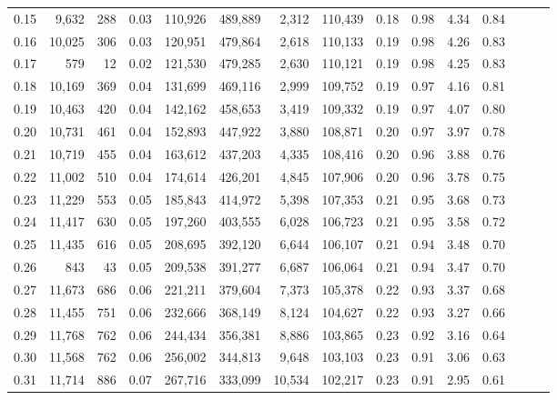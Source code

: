 \begin{tabular}{rrrrrrrrrrrrrrr}
0.15 &   9,632 &    288 &  0.03 &  110,926 &  489,889 &    2,312 &  110,439 &  0.18 &  0.98 &  4.34 &      0.84 \\
0.16 &  10,025 &    306 &  0.03 &  120,951 &  479,864 &    2,618 &  110,133 &  0.19 &  0.98 &  4.26 &      0.83 \\
0.17 &     579 &     12 &  0.02 &  121,530 &  479,285 &    2,630 &  110,121 &  0.19 &  0.98 &  4.25 &      0.83 \\
0.18 &  10,169 &    369 &  0.04 &  131,699 &  469,116 &    2,999 &  109,752 &  0.19 &  0.97 &  4.16 &      0.81 \\
0.19 &  10,463 &    420 &  0.04 &  142,162 &  458,653 &    3,419 &  109,332 &  0.19 &  0.97 &  4.07 &      0.80 \\
0.20 &  10,731 &    461 &  0.04 &  152,893 &  447,922 &    3,880 &  108,871 &  0.20 &  0.97 &  3.97 &      0.78 \\
0.21 &  10,719 &    455 &  0.04 &  163,612 &  437,203 &    4,335 &  108,416 &  0.20 &  0.96 &  3.88 &      0.76 \\
0.22 &  11,002 &    510 &  0.04 &  174,614 &  426,201 &    4,845 &  107,906 &  0.20 &  0.96 &  3.78 &      0.75 \\
0.23 &  11,229 &    553 &  0.05 &  185,843 &  414,972 &    5,398 &  107,353 &  0.21 &  0.95 &  3.68 &      0.73 \\
0.24 &  11,417 &    630 &  0.05 &  197,260 &  403,555 &    6,028 &  106,723 &  0.21 &  0.95 &  3.58 &      0.72 \\
0.25 &  11,435 &    616 &  0.05 &  208,695 &  392,120 &    6,644 &  106,107 &  0.21 &  0.94 &  3.48 &      0.70 \\
0.26 &     843 &     43 &  0.05 &  209,538 &  391,277 &    6,687 &  106,064 &  0.21 &  0.94 &  3.47 &      0.70 \\
0.27 &  11,673 &    686 &  0.06 &  221,211 &  379,604 &    7,373 &  105,378 &  0.22 &  0.93 &  3.37 &      0.68 \\
0.28 &  11,455 &    751 &  0.06 &  232,666 &  368,149 &    8,124 &  104,627 &  0.22 &  0.93 &  3.27 &      0.66 \\
0.29 &  11,768 &    762 &  0.06 &  244,434 &  356,381 &    8,886 &  103,865 &  0.23 &  0.92 &  3.16 &      0.64 \\
0.30 &  11,568 &    762 &  0.06 &  256,002 &  344,813 &    9,648 &  103,103 &  0.23 &  0.91 &  3.06 &      0.63 \\
0.31 &  11,714 &    886 &  0.07 &  267,716 &  333,099 &   10,534 &  102,217 &  0.23 &  0.91 &  2.95 &      0.61 \\

\end{tabular}
